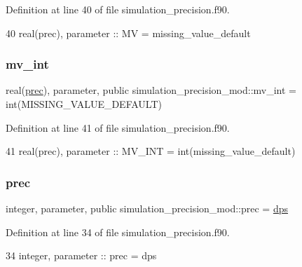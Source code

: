Definition at line 40 of file simulation\+\_\+precision.\+f90.


\begin{DoxyCode}
40     \textcolor{keywordtype}{real(prec)}, \textcolor{keywordtype}{parameter} :: MV     = missing\_value\_default
\end{DoxyCode}
\mbox{\label{namespacesimulation__precision__mod_abcad51274c804cb573d8f5720c5dfa05}} 
\subsubsection{\texorpdfstring{mv\+\_\+int}{mv\_int}}
{\footnotesize\ttfamily real(\mbox{\hyperlink{namespacesimulation__precision__mod_aaff1ddf996761a1e11e787d63e1612f6}{prec}}), parameter, public simulation\+\_\+precision\+\_\+mod\+::mv\+\_\+int = int(M\+I\+S\+S\+I\+N\+G\+\_\+\+V\+A\+L\+U\+E\+\_\+\+D\+E\+F\+A\+U\+LT)}



Definition at line 41 of file simulation\+\_\+precision.\+f90.


\begin{DoxyCode}
41     \textcolor{keywordtype}{real(prec)}, \textcolor{keywordtype}{parameter} :: MV\_INT = int(missing\_value\_default)
\end{DoxyCode}
\mbox{\label{namespacesimulation__precision__mod_aaff1ddf996761a1e11e787d63e1612f6}} 
\subsubsection{\texorpdfstring{prec}{prec}}
{\footnotesize\ttfamily integer, parameter, public simulation\+\_\+precision\+\_\+mod\+::prec = \mbox{\hyperlink{namespacesimulation__precision__mod_afa656a8f79bdee9d705fb5988ae40123}{dps}}}



Definition at line 34 of file simulation\+\_\+precision.\+f90.


\begin{DoxyCode}
34     \textcolor{keywordtype}{integer},  \textcolor{keywordtype}{parameter} :: prec      = dps
\end{DoxyCode}
\mbox{\label{namespacesimulation__precision__mod_a3833ad1bc52c3738ac861591b7492737}} 
